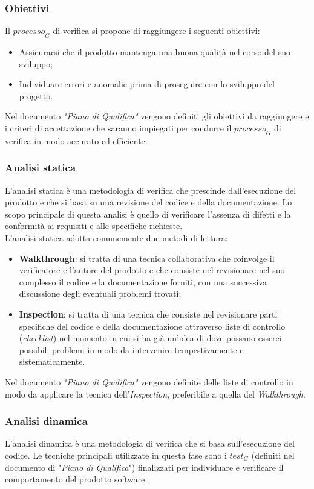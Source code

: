 \subsubsection{Obiettivi}
Il $\textit{processo}_G$ di verifica si propone di raggiungere i seguenti obiettivi:
\begin{itemize}
    \item Assicurarsi che il prodotto mantenga una buona qualità nel corso del suo sviluppo;
    \item Individuare errori e anomalie prima di proseguire con lo sviluppo del progetto.
\end{itemize}
Nel documento \emph{"Piano di Qualifica"} vengono definiti gli obiettivi da raggiungere e i criteri di accettazione  che saranno impiegati per condurre il $\textit{processo}_G$ di verifica in modo accurato ed efficiente. 
\subsubsection{Analisi statica}
L'analisi statica è una metodologia di verifica che prescinde dall'esecuzione del prodotto e che si basa su una revisione del codice e della documentazione. Lo scopo principale di questa analisi è quello di verificare l'assenza di difetti e la conformità ai requisiti e alle specifiche richieste. \\
L'analisi statica adotta comunemente due metodi di lettura:
\begin{itemize}
    \item \textbf{Walkthrough}: si tratta di una tecnica collaborativa che coinvolge il verificatore e l'autore del prodotto e che consiste nel revisionare nel suo complesso il codice e la documentazione forniti, con una successiva discussione degli eventuali problemi trovati;
    \item \textbf{Inspection}: si tratta di una tecnica che consiste nel revisionare parti specifiche del codice e della documentazione attraverso liste di controllo (\emph{checklist}) nel momento in cui si ha già un'idea di dove possano esserci possibili problemi in modo da intervenire tempestivamente e sistematicamente.
\end{itemize}
Nel documento \emph{"Piano di Qualifica"} vengono definite delle liste di controllo in modo da applicare la tecnica dell'\textit{Inspection}, preferibile a quella del \textit{Walkthrough}.
\subsubsection{Analisi dinamica}
L'analisi dinamica è una metodologia di verifica che si basa sull'esecuzione del codice. Le tecniche principali utilizzate in questa fase sono i $\textit{test}_G$ (definiti nel documento di "\emph{Piano di Qualifica}") finalizzati per individuare e verificare il comportamento del prodotto software.